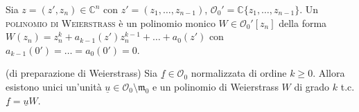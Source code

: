 \begin{defn}
  Sia $z=(z',z_n) \in \mathbb{C}^n$ con $z'=(z_1,\dots,z_{n-1})$, $\mathcal{O}_0'=\mathbb{C}\{z_1,\dots,z_{n-1}\}$. Un \textsc{polinomio di Weierstrass} è un polinomio monico $W \in \mathcal{O}_0'[z_n]$ della forma $W(z_n)=z_n^k+a_{k-1}(z')z_n^{k-1}+\dots+a_0(z')$ con $a_{k-1}(0')=\dots=a_0(0')=0$.
\end{defn}

\begin{thm}
  (di preparazione di Weierstrass) Sia $\underline{f} \in \mathcal{O}_0$ normalizzata di ordine $k \ge 0$. Allora esistono unici un'unità $\underline{u} \in \mathcal{O}_0\setminus\mathfrak{m}_0$ e un polinomio di Weierstrass $W$ di grado $k$ t.c. $\underline{f}=\underline{u}W$.
\end{thm}

